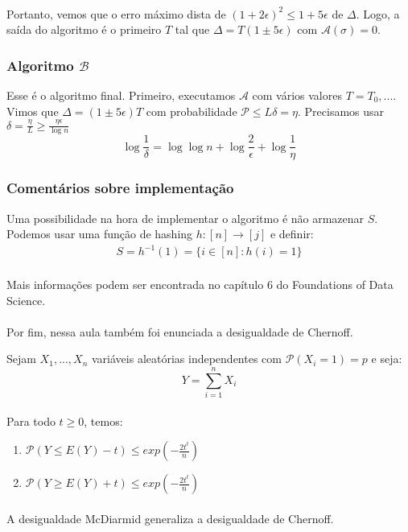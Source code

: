 \paragraph{}Portanto, vemos que o erro máximo dista de $(1 + 2\epsilon)^2 \leq 1 + 5\epsilon$ de $\Delta$. Logo, a saída do algoritmo é o primeiro $T$ tal que $\Delta = T(1 \pm 5\epsilon)$ com $\mathcal{A}(\sigma)=0$.
\subsubsection{Algoritmo $\mathcal{B}$}
Esse é o algoritmo final. Primeiro, executamos $\mathcal{A}$ com vários valores $T=T_0,...$. Vimos que $\Delta=(1 \pm 5\epsilon)T$ com probabilidade $\mathcal{P} \leq L\delta=\eta$. Precisamos usar $\delta=\frac{\eta}{L}\geq\frac{\eta \epsilon}{\log{n}}$
$$\log{\frac{1}{\delta}}=\log{\log{n}}+\log{\frac{2}{\epsilon}}+\log{\frac{1}{\eta}}$$

\subsubsection{Comentários sobre implementação}
Uma possibilidade na hora de implementar o algoritmo é não armazenar $S$. Podemos usar uma função de hashing $h:[n] \rightarrow [j]$ e definir:
\begin{align*}
    S = h^{-1}(1) = \{ i \in [n]: h(i) = 1\}
\end{align*}
\paragraph{}Mais informações podem ser encontrada no capítulo 6 do Foundations of Data Science.

\paragraph{}Por fim, nessa aula também foi enunciada a desigualdade de Chernoff.
\begin{lema}
 Sejam $X_1,...,X_n$ variáveis aleatórias independentes com $\mathcal{P}(X_i = 1) = p$ e seja:
$$Y = \sum_{i=1}^n X_i$$ 
\paragraph{} Para todo $t\geq 0$, temos:
\begin{enumerate}
    \centering
    \item $\mathcal{P}(Y \leq E(Y)-t) \leq exp(-\frac{2t^t}{n})$
    \item $\mathcal{P}(Y \geq E(Y)+t) \leq exp(-\frac{2t^t}{n})$
\end{enumerate}
\end{lema}
\paragraph{} A desigualdade McDiarmid generaliza a desigualdade de Chernoff.